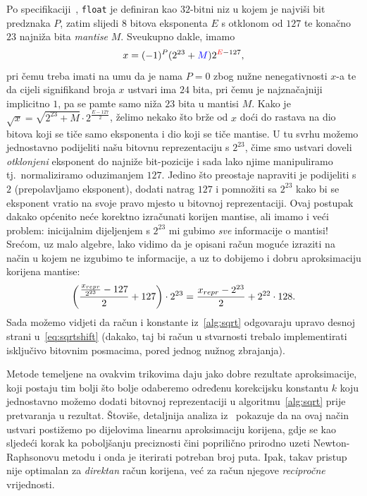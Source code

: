 \documentclass[12pt]{scrartcl}
\begin{document}
Po specifikaciji~\cite{goldberg}, \texttt{float} je definiran kao $32$-bitni niz u kojem je najviši bit predznaka $P$,
zatim slijedi $8$ bitova eksponenta $E$ s otklonom od $127$ te konačno $23$ najniža bita \emph{mantise} $M$. Sveukupno dakle, imamo 
\begin{equation}
    x = (-1)^P(2^{23} + \textcolor{blue}{M})2^{\textcolor{red}{E}-127},
\end{equation}
pri čemu treba imati na umu da je nama $P=0$ zbog nužne nenegativnosti $x$-a te da
 cijeli signifikand broja $x$ ustvari ima $24$ bita, pri čemu je najznačajniji implicitno $1$, pa se pamte
samo niža $23$ bita u mantisi $M$. Kako je $\sqrt{x} = \sqrt{2^{23}+M}\cdot 2^{\frac{E-127}{2}}$, želimo nekako što brže 
od $x$ doći do rastava na dio bitova koji se tiče samo eksponenta i dio koji se tiče mantise. U tu svrhu možemo jednostavno
podijeliti našu bitovnu reprezentaciju s $2^{23}$, čime smo ustvari doveli \emph{otklonjeni} eksponent do najniže bit-pozicije i sada
lako njime manipuliramo tj.\ normaliziramo oduzimanjem $127$. Jedino što preostaje napraviti je podijeliti s $2$ (prepolavljamo eksponent),
dodati natrag $127$ i pomnožiti sa $2^{23}$ kako bi se eksponent vratio na svoje pravo mjesto u bitovnoj reprezentaciji. Ovaj postupak
dakako općenito neće korektno izračunati korijen mantise, ali imamo i veći problem: inicijalnim dijeljenjem s $2^{23}$ mi gubimo \emph{sve} informacije
o mantisi! Srećom, uz malo algebre, lako vidimo da je opisani račun moguće izraziti na način u kojem ne izgubimo te informacije, a uz to dobijemo
i dobru aproksimaciju korijena mantise:
\begin{equation}\label{eq:sqrtshift}
    \left(\frac{\frac{x_{repr}}{2^{23}} - 127}{2} + 127\right) \cdot 2^{23} = \frac{x_{repr} - 2^{23}}{2} + 2^{22}\cdot 128\text.
\end{equation}
Sada možemo vidjeti da račun i konstante iz~\ref{alg:sqrt} odgovaraju upravo desnoj strani u~\eqref{eq:sqrtshift} (dakako, taj bi račun u 
stvarnosti trebalo implementirati isključivo bitovnim posmacima, pored jednog nužnog zbrajanja).

Metode temeljene na ovakvim trikovima daju jako dobre rezultate aproksimacije, koji postaju tim bolji što bolje odaberemo
određenu korekcijsku konstantu $k$ koju jednostavno možemo dodati bitovnoj reprezentaciji u 
algoritmu~\ref{alg:sqrt} prije pretvaranja u rezultat. Štoviše, detaljnija analiza iz~\cite{lomont} 
 pokazuje da na ovaj način ustvari postižemo po dijelovima linearnu aproksimaciju korijena, gdje se kao sljedeći korak ka poboljšanju
 preciznosti čini poprilično prirodno uzeti Newton-Raphsonovu metodu i onda je iterirati potreban broj puta. Ipak, takav pristup nije optimalan
 za \emph{direktan} račun korijena, već za račun njegove \emph{recipročne} vrijednosti.
\end{document}
